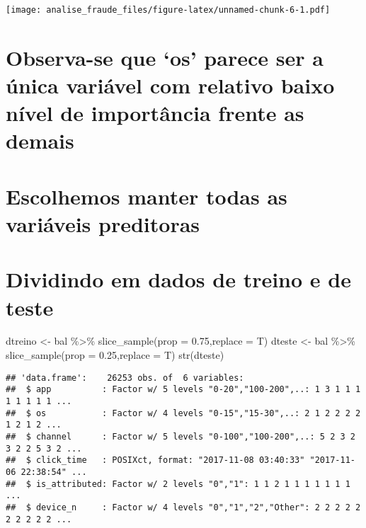 \documentclass[
]{article}
\newenvironment{Shaded}{\begin{snugshade}}{\end{snugshade}}
\newcommand{\AttributeTok}[1]{\textcolor[rgb]{0.77,0.63,0.00}{#1}}
\newcommand{\FloatTok}[1]{\textcolor[rgb]{0.00,0.00,0.81}{#1}}
\newcommand{\FunctionTok}[1]{\textcolor[rgb]{0.00,0.00,0.00}{#1}}
\newcommand{\NormalTok}[1]{#1}
\newcommand{\OtherTok}[1]{\textcolor[rgb]{0.56,0.35,0.01}{#1}}
\newcommand{\SpecialCharTok}[1]{\textcolor[rgb]{0.00,0.00,0.00}{#1}}
\begin{document}
\texttt{[image: analise\_fraude\_files/figure-latex/unnamed-chunk-6-1.pdf]}

\hypertarget{observa-se-que-os-parece-ser-a-uxfanica-variuxe1vel-com-relativo-baixo-nuxedvel-de-importuxe2ncia-frente-as-demais}{%
\section{Observa-se que `os' parece ser a única variável com relativo
baixo nível de importância frente as
demais}\label{observa-se-que-os-parece-ser-a-uxfanica-variuxe1vel-com-relativo-baixo-nuxedvel-de-importuxe2ncia-frente-as-demais}}

\hypertarget{escolhemos-manter-todas-as-variuxe1veis-preditoras}{%
\section{Escolhemos manter todas as variáveis
preditoras}\label{escolhemos-manter-todas-as-variuxe1veis-preditoras}}

\hypertarget{dividindo-em-dados-de-treino-e-de-teste}{%
\section{Dividindo em dados de treino e de
teste}\label{dividindo-em-dados-de-treino-e-de-teste}}

\begin{Shaded}
\begin{Highlighting}[]
\NormalTok{dtreino }\OtherTok{\textless{}{-}}\NormalTok{ bal }\SpecialCharTok{\%\textgreater{}\%} \FunctionTok{slice\_sample}\NormalTok{(}\AttributeTok{prop =} \FloatTok{0.75}\NormalTok{,}\AttributeTok{replace =}\NormalTok{ T)}
\NormalTok{dteste }\OtherTok{\textless{}{-}}\NormalTok{ bal }\SpecialCharTok{\%\textgreater{}\%} \FunctionTok{slice\_sample}\NormalTok{(}\AttributeTok{prop =} \FloatTok{0.25}\NormalTok{,}\AttributeTok{replace =}\NormalTok{ T)}
\FunctionTok{str}\NormalTok{(dteste)}
\end{Highlighting}
\end{Shaded}

\begin{verbatim}
## 'data.frame':    26253 obs. of  6 variables:
##  $ app          : Factor w/ 5 levels "0-20","100-200",..: 1 3 1 1 1 1 1 1 1 1 ...
##  $ os           : Factor w/ 4 levels "0-15","15-30",..: 2 1 2 2 2 2 1 2 1 2 ...
##  $ channel      : Factor w/ 5 levels "0-100","100-200",..: 5 2 3 2 3 2 2 5 3 2 ...
##  $ click_time   : POSIXct, format: "2017-11-08 03:40:33" "2017-11-06 22:38:54" ...
##  $ is_attributed: Factor w/ 2 levels "0","1": 1 1 2 1 1 1 1 1 1 1 ...
##  $ device_n     : Factor w/ 4 levels "0","1","2","Other": 2 2 2 2 2 2 2 2 2 2 ...
\end{verbatim}
\end{document}
